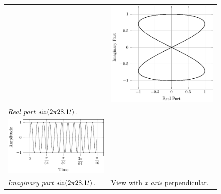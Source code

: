 \documentclass[../../course]{subfiles}
\begin{document}
\begin{figure} [H]
\begin{NiceTabularX} {\textwidth} {
            *{2}{>{\centering\arraybackslash}X}
        }
        &

         {
             {
                \includegraphics[height = \textheight] {tikzpics/plotFrontViewComplexD.pdf}
            }
        }

        \\

         {\emph{Real part} $\sin(2 \pi 28.1 t)$.}
        \label{plt:realCmplxD}

        &
        \\

         {
             {
                \includegraphics[height = \textheight] {tikzpics/plotShortX2.pdf}
            }
        }

        &
        \\

         {\emph{Imaginary part} $\sin(2 \pi 28.1 t)$.}
        \label{plt:imagCmplxD}

        &

         {View with \emph{x axis} perpendicular.}
        \label{plt:frontViewCmplxD}

        \\

    \end{NiceTabularX}

\end{figure}
\end{document}
